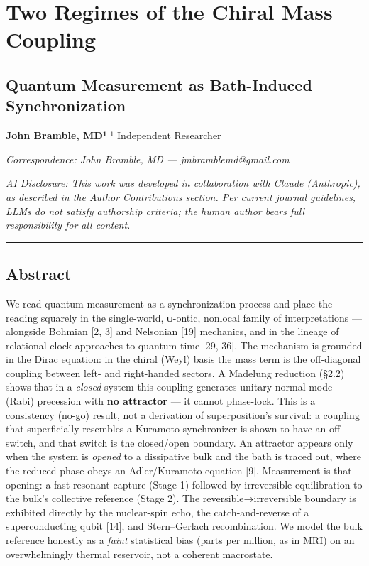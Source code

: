 \documentclass[
]{article}
\author{}
\date{}
\begin{document}
{
\setcounter{tocdepth}{3}
\tableofcontents
}
\section{Two Regimes of the Chiral Mass
Coupling}\label{two-regimes-of-the-chiral-mass-coupling}

\subsection{Quantum Measurement as Bath-Induced
Synchronization}\label{quantum-measurement-as-bath-induced-synchronization}

\textbf{John Bramble, MD¹} ¹ Independent Researcher

\emph{Correspondence: John Bramble, MD --- jmbramblemd@gmail.com}

\emph{AI Disclosure: This work was developed in collaboration with
Claude (Anthropic), as described in the Author Contributions section.
Per current journal guidelines, LLMs do not satisfy authorship criteria;
the human author bears full responsibility for all content.}

\begin{center}\rule{0.5\linewidth}{0.5pt}\end{center}

\subsection{Abstract}\label{abstract}

We read quantum measurement as a synchronization process and place the
reading squarely in the single-world, ψ-ontic, nonlocal family of
interpretations --- alongside Bohmian {[}2, 3{]} and Nelsonian {[}19{]}
mechanics, and in the lineage of relational-clock approaches to quantum
time {[}29, 36{]}. The mechanism is grounded in the Dirac equation: in
the chiral (Weyl) basis the mass term is the off-diagonal coupling
between left- and right-handed sectors. A Madelung reduction (§2.2)
shows that in a \emph{closed} system this coupling generates unitary
normal-mode (Rabi) precession with \textbf{no attractor} --- it cannot
phase-lock. This is a consistency (no-go) result, not a derivation of
superposition's survival: a coupling that superficially resembles a
Kuramoto synchronizer is shown to have an off-switch, and that switch is
the closed/open boundary. An attractor appears only when the system is
\emph{opened} to a dissipative bulk and the bath is traced out, where
the reduced phase obeys an Adler/Kuramoto equation {[}9{]}. Measurement
is that opening: a fast resonant capture (Stage 1) followed by
irreversible equilibration to the bulk's collective reference (Stage 2).
The reversible→irreversible boundary is exhibited directly by the
nuclear-spin echo, the catch-and-reverse of a superconducting qubit
{[}14{]}, and Stern--Gerlach recombination. We model the bulk reference
honestly as a \emph{faint} statistical bias (parts per million, as in
MRI) on an overwhelmingly thermal reservoir, not a coherent macrostate.
\end{document}
